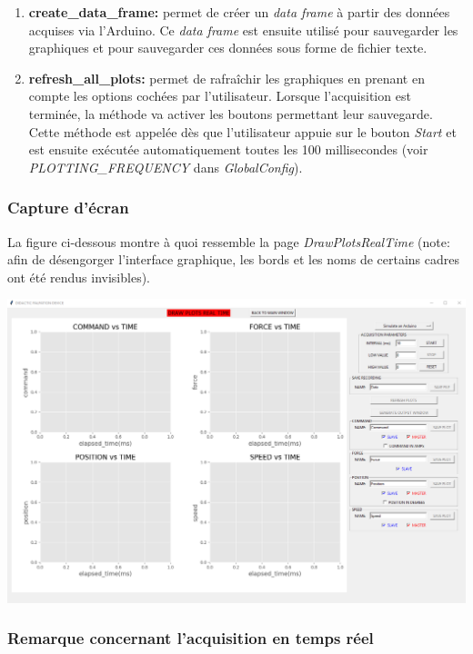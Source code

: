 \begin{enumerate}
    \item \textbf{create\_data\_frame:} permet de créer un \textit{data frame} à  partir des données acquises via l'Arduino. Ce \textit{data frame} est ensuite utilisé pour sauvegarder les graphiques et pour sauvegarder ces données sous forme de fichier texte.
    
    \item \textbf{refresh\_all\_plots:} permet de rafraîchir les graphiques en prenant en compte les options cochées par l'utilisateur. Lorsque l'acquisition est terminée, la méthode va activer les boutons permettant leur sauvegarde. Cette méthode est appelée dès que l'utilisateur appuie sur le bouton \textit{Start} et est ensuite exécutée automatiquement toutes les 100 millisecondes (voir \textit{PLOTTING\_FREQUENCY} dans \textit{GlobalConfig}).
\end{enumerate}

\subsubsection{Capture d'écran}

La figure ci-dessous montre à quoi ressemble la page \textit{DrawPlotsRealTime} (note: afin de désengorger l'interface graphique, les bords et les noms de certains cadres ont été rendus invisibles).

\begin{center}
    \includegraphics[width=16cm]{images/DrawPlotsRealTime-screenshot.png}
\end{center}

\subsubsection{Remarque concernant l'acquisition en temps réel}
\label{sec:remarque_acquisition}

